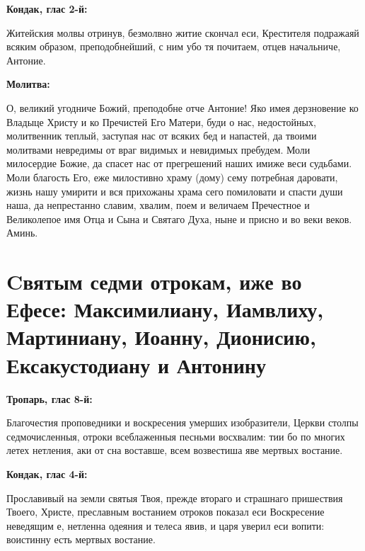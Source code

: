 \medskip


\bfseries Кондак, глас 2-й:\normalfont{}\nopagebreak


Житейския молвы отринув, безмолвно житие скончал еси, Крестителя подражаяй всяким образом, преподобнейший, с ним убо тя почитаем, отцев начальниче, Антоние.


\medskip


\bfseries Молитва:\normalfont{}\nopagebreak


О, великий угодниче Божий, преподобне отче Антоние! Яко имея дерзновение ко Владыце Христу и ко Пречистей Его Матери, буди о нас, недостойных, молитвенник теплый, заступая нас от всяких бед и напастей, да твоими молитвами невредимы от враг видимых и невидимых пребудем. Моли милосердие Божие, да спасет нас от прегрешений наших имиже веси судьбами. Моли благость Его, еже милостивно храму (дому) сему потребная даровати, жизнь нашу умирити и вся прихожаны храма сего помиловати и спасти души наша, да непрестанно славим, хвалим, поем и величаем Пречестное и Великолепое имя Отца и Сына и Святаго Духа, ныне и присно и во веки веков. Аминь.
\nopagebreak\bigskip\bigskip\mychapterending


 

\section{Cвятым седми отрокам, иже во Ефесе: Максимилиану, Иамвлиху, Мартиниану, Иоанну, Дионисию, Ексакустодиану и Антонину}
 


\bfseries Тропарь, глас 8-й:\normalfont{}\nopagebreak


Благочестия проповедники и воскресения умерших изобразители, Церкви столпы седмочисленныя, отроки всеблаженныя песньми восхвалим: тии бо по многих летех нетления, аки от сна воставше, всем возвестиша яве мертвых востание.


\medskip


\bfseries Кондак, глас 4-й:\normalfont{}\nopagebreak


Прославивый на земли святыя Твоя, прежде втораго и страшнаго пришествия Твоего, Христе, преславным востанием отроков показал еси Воскресение неведящим е, нетленна одеяния и телеса явив, и царя уверил еси вопити: воистинну есть мертвых востание.


\medskip


